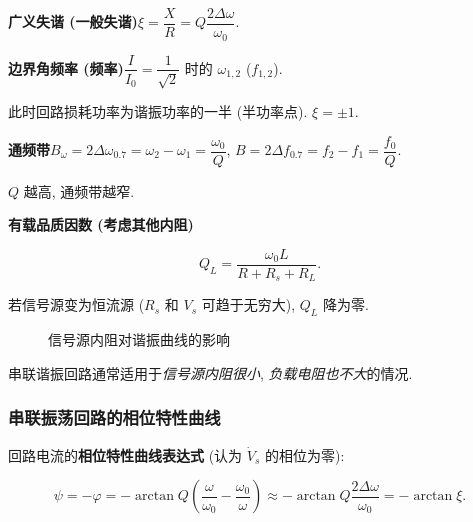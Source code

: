 \documentclass{notes}
\begin{document}
\textbf{广义失谐 (一般失谐)}\quad $\xi=\dfrac{X}{R}=Q\dfrac{2\Delta\omega}{\omega_0}$.

\textbf{边界角频率 (频率)}\quad $\dfrac{I}{I_0}=\dfrac{1}{\sqrt{2}}$ 时的 $\omega_{1,2}$ ($f_{1,2}$).

此时回路损耗功率为谐振功率的一半 (半功率点). $\xi=\pm 1$.

\textbf{通频带}\quad $B_\omega=2\Delta\omega_{0.7}=\omega_2-\omega_1=\dfrac{\omega_0}{Q}$, $B=2\Delta f_{0.7}=f_2-f_1=\dfrac{f_0}{Q}$.

$Q$ 越高, 通频带越窄.

\textbf{有载品质因数 (考虑其他内阻)}

\begin{equation}
    Q_L=\frac{\omega_0L}{R+R_s+R_L}.
\end{equation}

若信号源变为恒流源 ($R_s$ 和 $V_s$ 可趋于无穷大), $Q_L$ 降为零.

\begin{figure}[H]
    \centering
    \caption{信号源内阻对谐振曲线的影响}
\end{figure}

串联谐振回路通常适用于\textit{信号源内阻很小}, \textit{负载电阻也不大}的情况.

\subsubsection{串联振荡回路的相位特性曲线} \label{串联振荡回路的相位特性曲线}

回路电流的\textbf{相位特性曲线表达式} (认为 $\dot{V}_s$ 的相位为零):

\begin{equation} \label{eq:2.1 psi}
    \psi=-\varphi=-\arctan Q\left(\frac{\omega}{\omega_0}-\frac{\omega_0}{\omega}\right)\approx-\arctan Q\frac{2\Delta\omega}{\omega_0}=-\arctan\xi.
\end{equation}
\end{document}
